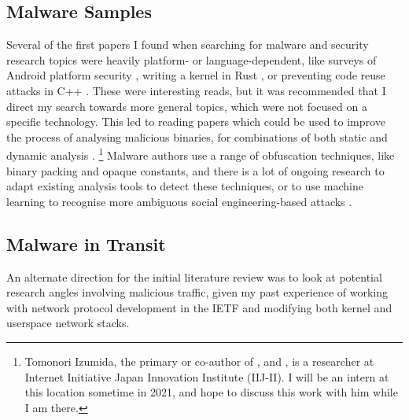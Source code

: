 \documentclass[10pt,sigconf]{acmart}
\begin{document}
\subsection{Malware Samples}
\label{malware-reading}
Several of the first papers I found when searching for malware and security research topics were heavily platform- or language-dependent, like surveys of Android platform security \cite{bhat2019} \cite{tam2017}, writing a kernel in Rust \cite{levy2017}, or preventing code reuse attacks in C++ \cite{schuster2015}.
These were interesting reads, but it was recommended that I direct my search towards more general topics, which were not focused on a specific technology.
This led to reading papers which could be used to improve the process of analysing malicious binaries, for combinations of both static and dynamic analysis \cite{or-meir2017} \cite{afianian2019} \cite{izumida2010} \cite{izumida2018} \cite{mori2006}.
\footnote{Tomonori Izumida, the primary or co-author of \cite{mori2006}, \cite{izumida2010} and \cite{izumida2018}, is a researcher at Internet Initiative Japan Innovation Institute (IIJ-II). I will be an intern at this location sometime in 2021, and hope to discuss this work with him while I am there.}
Malware authors use a range of obfuscation techniques, like binary packing and opaque constants, and there is a lot of ongoing research to adapt existing analysis tools to detect these techniques, or to use machine learning to recognise more ambiguous social engineering-based attacks \cite{maiorca2019}.


\subsection{Malware in Transit}
\label{malware-in-transit}
An alternate direction for the initial literature review was to look at potential research angles involving malicious traffic, given my past experience of working with network protocol development in the IETF and modifying both kernel and userspace network stacks.
\end{document}
